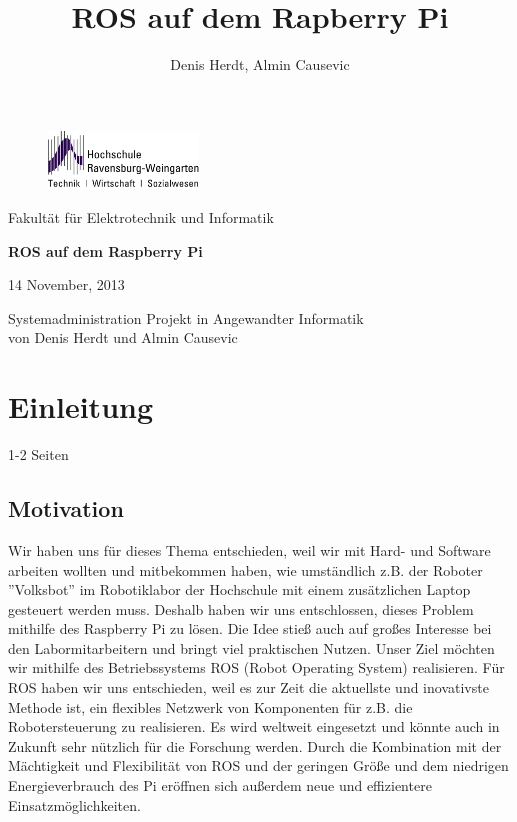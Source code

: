\documentclass[12pt]{article}
\author{Denis Herdt, Almin Causevic}
\title{ROS auf dem Rapberry Pi}
\begin{document}
\begin{figure}[h]

\includegraphics[width=4cm]{hs-logo.jpg}
\end{figure}
Fakultät für Elektrotechnik und Informatik

\vspace{3cm}

\begin{center}

{\bf \huge ROS auf dem Raspberry Pi}
\vspace{4cm}

14 November, 2013
\vspace{1cm}

Systemadministration Projekt in Angewandter Informatik \\
von Denis Herdt und Almin Causevic

\end{center}

\pagebreak

\tableofcontents

\pagebreak

\section{Einleitung}
1-2 Seiten
\subsection{Motivation}

Wir haben uns für dieses Thema entschieden, weil wir 
mit Hard- und Software arbeiten wollten und mitbekommen haben, wie umständlich z.B.
der Roboter ''Volksbot'' im Robotiklabor der Hochschule mit einem zusätzlichen Laptop gesteuert werden muss. Deshalb haben wir uns entschlossen, dieses Problem mithilfe des Raspberry Pi zu lösen. Die Idee stieß auch auf großes Interesse bei den 
Labormitarbeitern und bringt viel praktischen Nutzen.
Unser Ziel möchten wir mithilfe des Betriebssystems ROS (Robot Operating System) realisieren.
Für ROS haben wir uns entschieden, weil es zur Zeit die aktuellste und inovativste Methode ist, ein flexibles Netzwerk von Komponenten für z.B. die Robotersteuerung zu realisieren. Es wird weltweit eingesetzt und könnte auch in Zukunft sehr nützlich für die Forschung werden. %
Durch die Kombination mit der Mächtigkeit und Flexibilität von ROS und der geringen Größe und dem niedrigen Energieverbrauch des Pi eröffnen sich außerdem neue und effizientere Einsatzmöglichkeiten.
\end{document}
